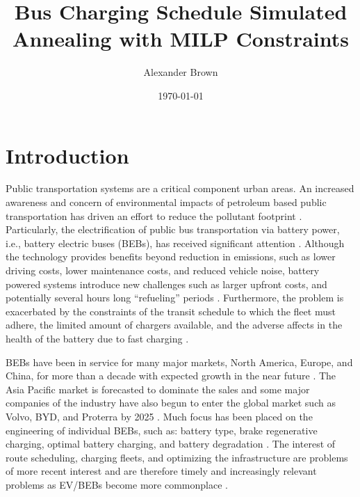 \documentclass[11pt,a4paper,final]{article}
\author{Alexander Brown}
\date{\today}
\title{Bus Charging Schedule Simulated Annealing with MILP Constraints}
\begin{document}
\maketitle
\tableofcontents

\parskip 3mm                                %
\let\ref\autoref                            %

\section{Introduction}
\label{sec:introduction}
Public transportation systems are a critical component urban areas. An increased awareness and concern of environmental
impacts of petroleum based public transportation has driven an effort to reduce the pollutant footprint
\cite{de-2014-simul-elect,xylia-2018-role-charg,guida-2017-zeeus-repor-europ,li-2016-batter-elect}. Particularly,
the electrification of public bus transportation via battery power, i.e., battery electric buses (BEBs), has received
significant attention \cite{li-2016-batter-elect}. Although the technology provides benefits beyond reduction in
emissions, such as lower driving costs, lower maintenance costs, and reduced vehicle noise, battery powered systems
introduce new challenges such as larger upfront costs, and potentially several hours long ``refueling'' periods
\cite{xylia-2018-role-charg,li-2016-batter-elect}. Furthermore, the problem is exacerbated by the constraints of the
transit schedule to which the fleet must adhere, the limited amount of chargers available, and the adverse affects in
the health of the battery due to fast charging \cite{lutsey-2019-updat-elect}.

BEBs have been in service for many major markets, North America, Europe, and China, for more than a decade with expected
growth in the near future \cite{deng-2021-survey-elect}. The Asia Pacific market is forecasted to dominate the sales
and some major companies of the industry have also begun to enter the global market such as Volvo, BYD, and Proterra by
2025 \cite{deng-2021-survey-elect}. Much focus has been placed on the engineering of individual BEBs, such as: battery
type, brake regenerative charging, optimal battery charging, and battery degradation \cite{chen-2008-desig-grey,abdollahi-2016-optim-batter,kuhne-2010-elect,deng-2021-survey-elect}. The interest of route scheduling, charging
fleets, and optimizing the infrastructure are problems of more recent interest and are therefore timely and increasingly
relevant problems as EV/BEBs become more commonplace \cite{hoke-2014-accoun-lithium,sebastiani-2016-evaluat-elect,wei-2018-optim-spatio}.
\end{document}
